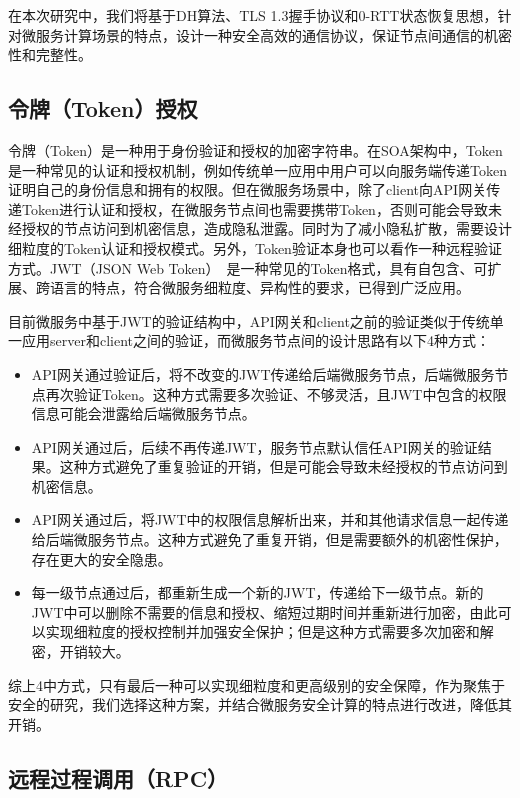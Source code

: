 在本次研究中，我们将基于DH算法、TLS 1.3握手协议和0-RTT状态恢复思想，针对微服务计算场景的特点，设计一种安全高效的通信协议，保证节点间通信的机密性和完整性。

\subsection{令牌（Token）授权}


令牌（Token）是一种用于身份验证和授权的加密字符串。在SOA架构中，Token是一种常见的认证和授权机制，例如传统单一应用中用户可以向服务端传递Token证明自己的身份信息和拥有的权限。但在微服务场景中，除了client向API网关传递Token进行认证和授权，在微服务节点间也需要携带Token，否则可能会导致未经授权的节点访问到机密信息，造成隐私泄露。同时为了减小隐私扩散，需要设计细粒度的Token认证和授权模式。另外，Token验证本身也可以看作一种远程验证方式。JWT（JSON Web Token）~\cite{}是一种常见的Token格式，具有自包含、可扩展、跨语言的特点，符合微服务细粒度、异构性的要求，已得到广泛应用。

目前微服务中基于JWT的验证结构中，API网关和client之前的验证类似于传统单一应用server和client之间的验证，而微服务节点间的设计思路有以下4种方式：

\begin{itemize}
    \item API网关通过验证后，将不改变的JWT传递给后端微服务节点，后端微服务节点再次验证Token。这种方式需要多次验证、不够灵活，且JWT中包含的权限信息可能会泄露给后端微服务节点。
    \item API网关通过后，后续不再传递JWT，服务节点默认信任API网关的验证结果。这种方式避免了重复验证的开销，但是可能会导致未经授权的节点访问到机密信息。
    \item API网关通过后，将JWT中的权限信息解析出来，并和其他请求信息一起传递给后端微服务节点。这种方式避免了重复开销，但是需要额外的机密性保护，存在更大的安全隐患。
    \item 每一级节点通过后，都重新生成一个新的JWT，传递给下一级节点。新的JWT中可以删除不需要的信息和授权、缩短过期时间并重新进行加密，由此可以实现细粒度的授权控制并加强安全保护；但是这种方式需要多次加密和解密，开销较大。
\end{itemize}

综上4中方式，只有最后一种可以实现细粒度和更高级别的安全保障，作为聚焦于安全的研究，我们选择这种方案，并结合微服务安全计算的特点进行改进，降低其开销。

\subsection{远程过程调用（RPC）}

